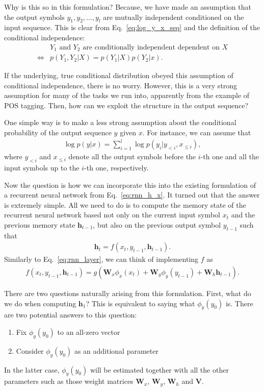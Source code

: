 \documentclass{report}
\newcommand{\vect}[1]{\mathbf{#1}}
\newcommand{\matr}[1]{\mathbf{#1}}
\newcommand{\vh}[0]{\vect{h}}
\newcommand{\mW}[0]{\matr{W}}
\newcommand{\mV}[0]{\matr{V}}
\begin{document}
Why is this so in this formulation? Because, we have made an assumption that the
output symbols $y_1, y_2, \ldots, y_l$ are mutually independent conditioned on
the input sequence. This is clear from Eq.~\eqref{eq:log_y_x_seq} and the
definition of the conditional independence:
\begin{align*}
    &\text{$Y_1$ and $Y_2$ are conditionally independent dependent on $X$} \\
    \iff&
    p(Y_1, Y_2|X) = p(Y_1|X)p(Y_2|x).
\end{align*}

If the underlying, true conditional distribution obeyed this assumption of
conditional independence, there is no worry. However, this is a very strong
assumption for many of the tasks we run into, apparently from the example of POS
tagging. Then, how can we exploit the structure in the output sequence?

One simple way is to make a less strong assumption about the conditional
probability of the output sequence $y$ given $x$. For instance, we can assume
that
\begin{align*}
    \log p(y|x) = \sum_{i=1}^l \log p(y_i|y_{<i}, x_{\leq i}),
\end{align*}
where $y_{<i}$ and $x_{\leq i}$ denote all the output symbols before the $i$-th one 
and all the input symbols up to the $i$-th one, respectively.

Now the question is how we can incorporate this into the existing formulation of
a recurrent neural network from Eq.~\eqref{eq:rnn_h_x}. It turned out that the
answer is extremely simple. All we need to do is to compute the memory state of
the recurrent neural network based not only on the current input symbol $x_t$
and the previous memory state $\vh_{t-1}$, but also on the previous output
symbol $y_{t-1}$ such that
\begin{align*}
    \vh_t = f(x_t, y_{t-1}, \vh_{t-1}).
\end{align*}
Similarly to Eq.~\eqref{eq:rnn_layer}, we can think of implementing $f$ as
\begin{align*}
    f(x_t, y_{t-1}, \vh_{t-1}) = g(\mW_x \phi_x(x_t) + \mW_y \phi_y(y_{t-1}) +
    \mW_h \vh_{t-1}).
\end{align*}

There are two questions naturally arising from this formulation. First, what do
we do when computing $\vh_1$? This is equivalent to saying what $\phi_y(y_{0})$
is. There are two potential answers to this question:
\begin{enumerate}
    \itemsep 0em
    \item Fix $\phi_y(y_0)$ to an all-zero vector
    \item Consider $\phi_y(y_0)$ as an additional parameter
\end{enumerate}
In the latter case, $\phi_y(y_0)$ will be estimated together with all the other
parameters such as those weight matrices $\mW_x$, $\mW_y$, $\mW_h$ and $\mV$.
\end{document}
